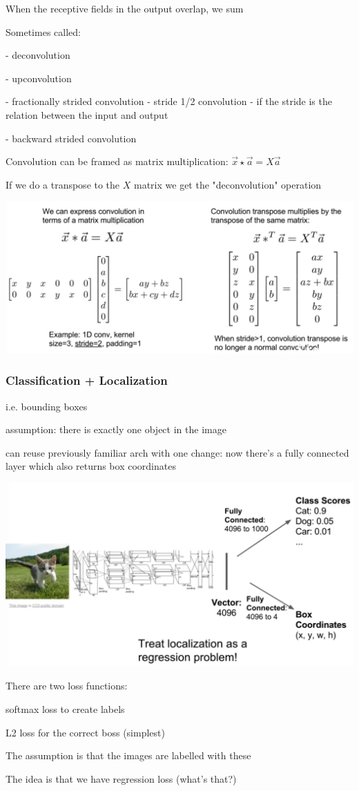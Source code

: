 When the receptive fields in the output overlap, we sum

Sometimes called: 

- deconvolution

- upconvolution

- fractionally strided convolution 
- stride 1/2 convolution - if the stride is the relation between the input and output

- backward strided convolution

Convolution can be framed as matrix multiplication: $\vec x \star \vec a = X\vec a$

If we do a transpose to the $X$ matrix we get the "deconvolution" operation

\includegraphics[width=0.5\columnwidth]{fei_fei_li/lecture_11/trans_conv_math.png}

\subsubsection{Classification + Localization}

i.e. bounding boxes

assumption: there is exactly one object in the image

can reuse previously familiar arch with one change: now there's a fully connected layer which also returns box coordinates

\includegraphics[width=0.5\columnwidth]{fei_fei_li/lecture_11/class_loc.png}

There are two loss functions:

softmax loss to create labels

L2 loss for the correct boss (simplest)

The assumption is that the images are labelled with these

The idea is that we have regression loss (what's that?)

